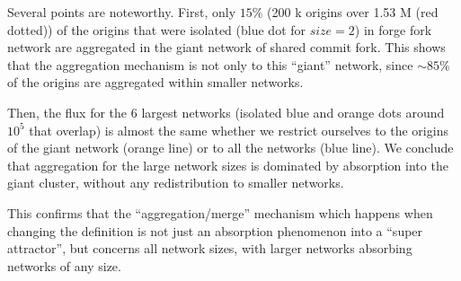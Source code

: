 Several points are noteworthy.
First, only $15\%$ (200 k origins over 1.53 M (red dotted)) of the
origins that were isolated (blue dot for $size=2$) in forge fork network
are aggregated in the giant network of shared commit fork.
This shows that the aggregation mechanism is not only to this ``giant''
network, since $\sim 85\%$ of the origins are aggregated within smaller
networks.

Then, the flux for the 6 largest networks (isolated blue and orange dots around
$10^5$ that overlap) is almost the same whether we restrict ourselves to the
origins of the giant network (orange line) or to all the networks (blue line).
We conclude that aggregation for the large network sizes is dominated by
absorption into the giant cluster, without any redistribution to smaller
networks.

This confirms that the ``aggregation/merge'' mechanism which happens when
changing the definition is not just an absorption phenomenon into a ``super
attractor'', but concerns all network sizes, with larger networks absorbing
networks of any size.




